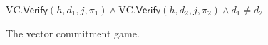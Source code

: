 \begin{figure}[t]
\begin{algorithm}[H]
    \caption{\label{alg.vector-game} The vector commitment game.}
    \begin{algorithmic}[1]
          \State\Return $\textrm{VC}.\textsf{Verify}(h, d_1, j, \pi_1) \land \textrm{VC}.\textsf{Verify}(h, d_2, j, \pi_2) \land d_1 \neq d_2$
        \EndFunction
        \vskip8pt
    \end{algorithmic}
\end{algorithm}
\end{figure}
